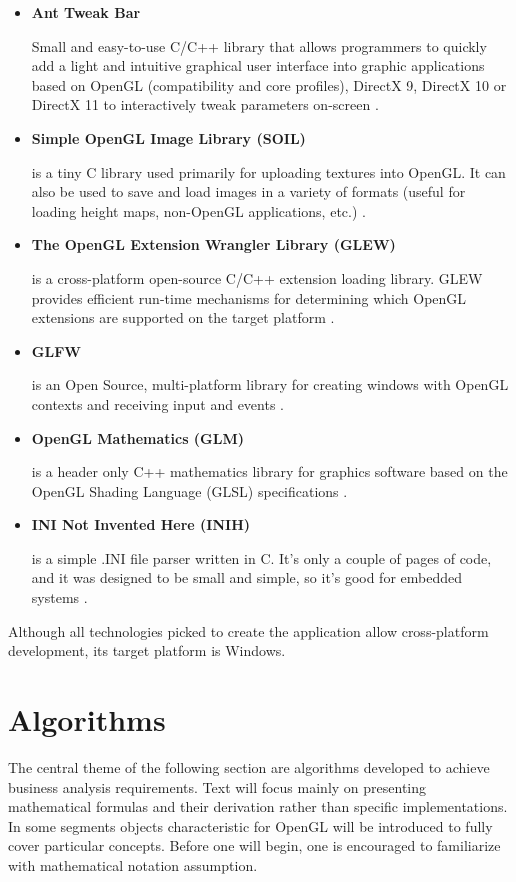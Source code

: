 \documentclass{report}
\begin{document}
\begin{itemize}
\item \textbf{Ant Tweak Bar}

Small and easy-to-use C/C++ library that allows programmers to quickly add a light and intuitive graphical user interface into graphic applications based on OpenGL (compatibility and core profiles), DirectX 9, DirectX 10 or DirectX 11 to interactively tweak parameters on-screen \cite{anttweakbar}.

\item \textbf{Simple OpenGL Image Library (SOIL)}

is a tiny C library used primarily for uploading textures into OpenGL. It can also be used to save and load images in a variety of formats (useful for loading height maps, non-OpenGL applications, etc.) \cite{soil}.
\item \textbf{The OpenGL Extension Wrangler Library (GLEW)}

is a cross-platform open-source C/C++ extension loading library. GLEW provides efficient run-time mechanisms for determining which OpenGL extensions are supported on the target platform \cite{glew}.
\item \textbf{GLFW}

is an Open Source, multi-platform library for creating windows with OpenGL contexts and receiving input and events \cite{glfw}.
\item \textbf{OpenGL Mathematics (GLM) }

is a header only C++ mathematics library for graphics software based on the OpenGL Shading Language (GLSL) specifications \cite{glm}.
\item \textbf{INI Not Invented Here (INIH)}

is a simple .INI file parser written in C. It's only a couple of pages of code, and it was designed to be small and simple, so it's good for embedded systems \cite{inih}.
\end{itemize}
Although all technologies picked to create the application allow cross-platform development, its target platform is Windows. 



\section{Algorithms} \label{sec:algorithms}
The central theme of the following section are algorithms developed to achieve business analysis requirements. Text will focus mainly on presenting mathematical formulas and their derivation rather than specific implementations. In some segments objects characteristic for OpenGL will be introduced to fully cover particular concepts. Before one will begin, one is encouraged to familiarize with mathematical notation assumption. 
\end{document}
